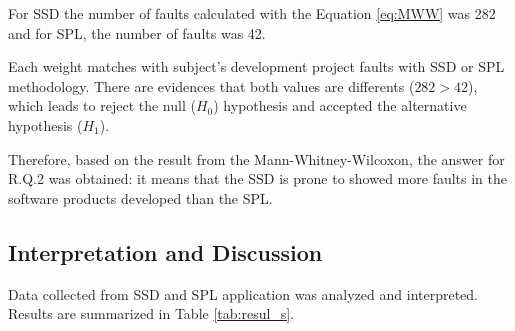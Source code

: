 \begin{itemize}
\begin{itemize}
	\end{itemize}	

For SSD the number of faults calculated with the Equation \ref{eq:MWW} was 282 and for SPL, the number of faults was 42.















Each weight matches with subject's development project faults with SSD or SPL methodology. There are evidences that both values are differents ($282>42$), which leads to reject the null ($H_0$) hypothesis and accepted the alternative hypothesis ($H_{1}$).

Therefore, based on the result from the Mann-Whitney-Wilcoxon, the answer for R.Q.2 was obtained: it means that the SSD is prone to showed more faults in the software products developed than the SPL.




\end{itemize}







\subsection{Interpretation and Discussion}\label{sub:interpretation}

Data collected from SSD and SPL application was analyzed and interpreted. %
Results are summarized in Table \ref{tab:resul_s}.




